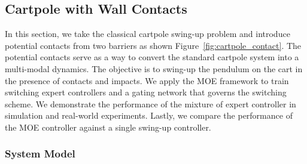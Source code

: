 \subsection{Cartpole with Wall Contacts}
\label{ssec:cartpole_with_walls}

In this section, we take the classical cartpole swing-up problem and introduce
potential contacts from two barriers as shown Figure~\ref{fig:cartpole_contact}. 
%
The potential contacts serve as a way to convert the standard cartpole system
into a multi-modal dynamics.
%
The objective is to swing-up the pendulum on the cart in the presence of
contacts and impacts.
%
We apply the MOE framework to train switching expert controllers and a gating
network that governs the switching scheme.
%
We demonstrate the performance of the mixture of expert controller in
simulation and real-world experiments.
%
Lastly, we compare the performance of the MOE controller against
a single swing-up controller. 


\subsubsection{System Model}
\label{sssec:cartpole_model}

